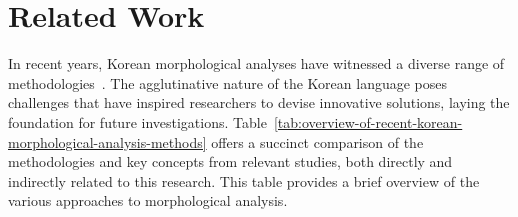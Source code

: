 \documentclass[AMS,STIX2COL]{WileyNJD-v2}
\begin{document}
    \section{Related Work}\label{sec:related-work}

    In recent years, Korean morphological analyses have witnessed a diverse range of methodologies~\cite{KwonHC1991, LeeDG2009, ShimKS2011, LeeJS2011, ShinJC2012, LeeCK2013, NaSH2014, NaSH2015, HwangHS2016, KimHM2016, ChungES2016, LeeCH2016, Li2017, NaSH2018, KimSW2018, ChoiYS2018, MinJW2018, MinJW2019, KimHM2019, SongHJ2019, MinJW2020, SongHJ2020, ChoiYS2020, HwangHS2020, KimHJ2021, YounJY2021, MinJW2022, KimJM2022, ShinHJ2023}.
    The agglutinative nature of the Korean language poses challenges that have inspired researchers to devise innovative solutions, laying the foundation for future investigations.
    Table~\ref{tab:overview-of-recent-korean-morphological-analysis-methods} offers a succinct comparison of the methodologies and key concepts from relevant studies, both directly and indirectly related to this research.
    This table provides a brief overview of the various approaches to morphological analysis.
\end{document}
